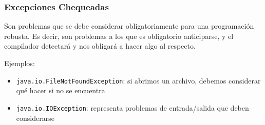 \documentclass{beamer}
\newcommand{\codet}[1]{\texttt{#1}}
\begin{document}
\begin{frame}
  \frametitle{Excepciones Chequeadas}
    
  \begin{block}{}
    Son problemas que se debe considerar obligatoriamente para una
    programación robusta. Es decir, son problemas a los que es
    obligatorio anticiparse, y el compilador detectará y nos obligará
    a hacer algo al respecto.
  \end{block}

  \begin{block}{}
    Ejemplos:

    \begin{itemize}
    \item \codet{java.io.FileNotFoundException}: si abrimos un
      archivo, debemos considerar qué hacer si no se encuentra
    \item \codet{java.io.IOException}: representa problemas de
      entrada/salida que deben considerarse
    \end{itemize}
  \end{block}

\end{frame}
\end{document}
